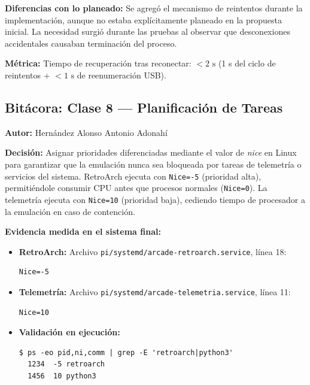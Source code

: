 \textbf{Diferencias con lo planeado:} Se agregó el mecanismo de reintentos durante la implementación, aunque no estaba explícitamente planeado en la propuesta inicial. La necesidad surgió durante las pruebas al observar que desconexiones accidentales causaban terminación del proceso.

\textbf{Métrica:} Tiempo de recuperación tras reconectar: $< 2\text{ s}$ (1 s del ciclo de reintentos + $< 1\text{ s}$ de reenumeración USB).


\subsection{Bitácora: Clase 8 — Planificación de Tareas}
\textbf{Autor:} Hernández Alonso Antonio Adonahí

\textbf{Decisión:} Asignar prioridades diferenciadas mediante el valor de \textit{nice} en Linux para garantizar que la emulación nunca sea bloqueada por tareas de telemetría o servicios del sistema. RetroArch ejecuta con \texttt{Nice=-5} (prioridad alta), permitiéndole consumir CPU antes que procesos normales (\texttt{Nice=0}). La telemetría ejecuta con \texttt{Nice=10} (prioridad baja), cediendo tiempo de procesador a la emulación en caso de contención.

\textbf{Evidencia medida en el sistema final:}
\begin{itemize}
	\item \textbf{RetroArch:} Archivo \texttt{pi/systemd/arcade-retroarch.service}, línea 18:
	\begin{lstlisting}
Nice=-5
	\end{lstlisting}
	\item \textbf{Telemetría:} Archivo \texttt{pi/systemd/arcade-telemetria.service}, línea 11:
	\begin{lstlisting}
Nice=10
	\end{lstlisting}
	\item \textbf{Validación en ejecución:}
	\begin{lstlisting}
$ ps -eo pid,ni,comm | grep -E 'retroarch|python3'
  1234  -5 retroarch
  1456  10 python3
	\end{lstlisting}
\end{itemize}

